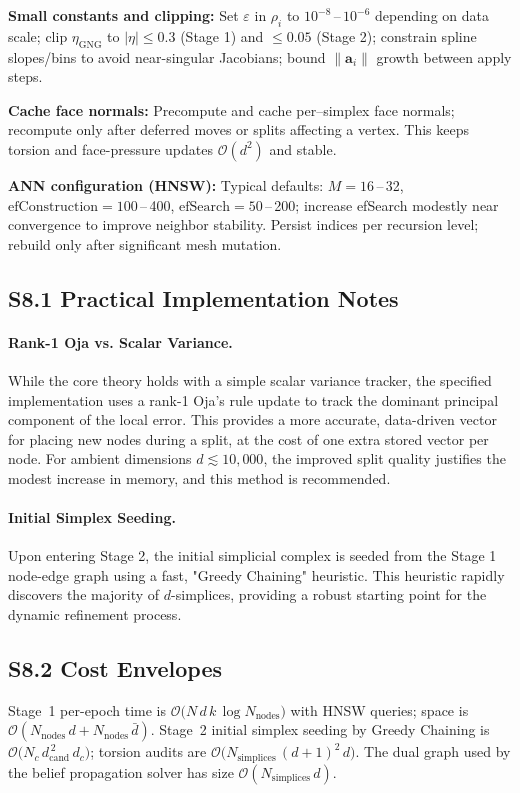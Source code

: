 \documentclass[11pt]{article}
\begin{document}
\textbf{Small constants and clipping:} Set $\varepsilon$ in $\rho_i$ to $10^{-8}$\,–\,$10^{-6}$ depending on data scale; clip $\eta_{\mathrm{GNG}}$ to $\lvert\eta\rvert\le 0.3$ (Stage 1) and $\le 0.05$ (Stage 2); constrain spline slopes/bins to avoid near-singular Jacobians; bound $\lVert\mathbf a_i\rVert$ growth between apply steps.

\textbf{Cache face normals:} Precompute and cache per–simplex face normals; recompute only after deferred moves or splits affecting a vertex. This keeps torsion and face-pressure updates $\mathcal O(d^2)$ and stable.

\textbf{ANN configuration (HNSW):} Typical defaults: $M{=}16$\,–\,32, $\mathrm{efConstruction}{=}100$\,–\,400, $\mathrm{efSearch}{=}50$\,–\,200; increase efSearch modestly near convergence to improve neighbor stability. Persist indices per recursion level; rebuild only after significant mesh mutation.

\subsection*{S8.1 Practical Implementation Notes}
\paragraph{Rank-1 Oja vs. Scalar Variance.} While the core theory holds with a simple scalar variance tracker, the specified implementation uses a rank-1 Oja's rule update to track the dominant principal component of the local error. This provides a more accurate, data-driven vector for placing new nodes during a split, at the cost of one extra stored vector per node. For ambient dimensions $d \lesssim 10,000$, the improved split quality justifies the modest increase in memory, and this method is recommended.

\paragraph{Initial Simplex Seeding.} Upon entering Stage 2, the initial simplicial complex is seeded from the Stage 1 node-edge graph using a fast, "Greedy Chaining" heuristic. This heuristic rapidly discovers the majority of $d$-simplices, providing a robust starting point for the dynamic refinement process.

\subsection*{S8.2 Cost Envelopes}
Stage~1 per-epoch time is $\mathcal O\bigl(N\,d\,k\,\log N_{\mathrm{nodes}}\bigr)$ with HNSW queries; space is $\mathcal O(N_{\mathrm{nodes}}\,d + N_{\mathrm{nodes}}\,\bar d)$. Stage~2 initial simplex seeding by Greedy Chaining is $\mathcal O\bigl(N_c\,d_{\mathrm{cand}}^{\,2}\,d_c\bigr)$; torsion audits are $\mathcal O\bigl(N_{\mathrm{simplices}}\,(d{+}1)^2\,d\bigr)$. The dual graph used by the belief propagation solver has size $\mathcal O(N_{\mathrm{simplices}}\,d)$.
\end{document}
